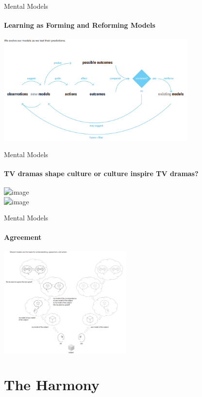 \documentclass[
	11pt,
	aspectratio=169,
]{beamer}
\begin{document}
                \begin{frame}{Mental Models \cite{dubberly2009}}
                    \framesubtitle{Learning as Forming and Reforming Models}
                    \centering\includegraphics[width=0.75\textwidth]{resources/learning.PNG}
                \end{frame}
                \begin{frame}{Mental Models \cite{dubberly2009}}
                    \framesubtitle{TV dramas shape culture or culture inspire TV dramas?}
                    \centering\includegraphics<1->[width=0.75\textwidth]{resources/models4.PNG} \\
                    \centering\includegraphics<2->[width=0.25\textwidth]{resources/chickenegg.jpg}
                \end{frame}
                \begin{frame}{Mental Models \cite{dubberly2009}}
                    \framesubtitle{Agreement}
                    \centering\includegraphics[width=0.5\textwidth]{resources/models5.PNG}
                \end{frame}
    \section{The Harmony}
\end{document}
